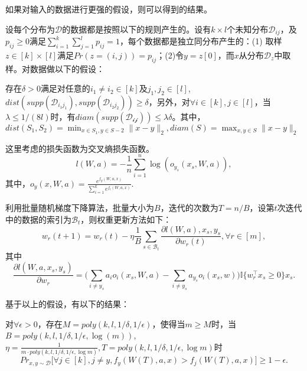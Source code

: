 \par
如果对输入的数据进行更强的假设，则可以得到\citet{li2018learning}的结果。
\par
设每个分布为$\mathcal{D}$的数据都是按照以下的规则产生的。设有$k\times l $个未知分布$\mathcal{D}_{ij}$，及$p_{ij}\geq 0 $满足$\sum_{i=1}^k \sum_{j=1}^l p_{ij} = 1$，每个数据都是独立同分布产生的：(1) 取样$z\in[k]\times [l]$满足$Pr(z = (i,j)) = p_{ij}$；(2)令$y = z[0]$，而$x$从分布$\mathcal{D}_{z}$中取样。对数据做以下的假设：
\begin{assumption}
存在$\delta > 0$满足对任意的$i_1\neq i_2 \in [k]$及$j_1,j_2\in [l]$,$dist(supp(\mathcal{D}_{i_1j_1}),supp(\mathcal{D}_{i_2j_2}))\geq \delta$，另外，对$\forall i\in [k],j\in[l]$，当$\lambda \leq 1/(8l)$时，有$diam(supp(\mathcal{D_{ij}}))\leq \lambda\delta$。其中，$dist(S_1,S_2) = \min_{x\in S_1, y\in S-2} \|x-y\|_2, diam(S) = \max_{x,y\in S} \|x-y\|_2$
\end{assumption}
\par
这里考虑的损失函数为交叉熵损失函数。
\[
l(W,a) = -\frac{1}{n}\sum_{i=1}^n\log(o_{y_s}(x_s,W,a)),
\]
其中，$o_y(x,W,a) = \frac{e^{f_y(W,a,x)}}{\sum_{i=1}^ke^{f_i(W,a,x)}}$.
\par
利用批量随机梯度下降算法，批量大小为$B$，迭代的次数为$T = n/B$，设第$t$次迭代中的数据的索引为$\mathcal{B}_t$，则权重更新方法如下：
\begin{equation}
w_r(t+1) = w_r(t) - \eta\frac{1}{B}\sum_{s\in \mathcal{B}_t}\frac{\partial l(W,a),x_s,y_s}{\partial w_r(t)}, \forall r \in [m],
\end{equation}
其中
\[
\frac{\partial l(W,a,x_s,y_s)}{\partial w_r} = \bigg(\sum_{i\neq y_s }a_i o_i(x_s,W,a)- \sum_{i\neq y_s}a_{y_s}o_i(x_s,w)\bigg)\mathbb{I}\{w_r^\top x_s\geq 0\}x_s.
\]
\par
基于以上的假设，有以下的结果：
\begin{theorem}
对$\forall \epsilon > 0$，存在$M = poly(k,l,1/\delta,1/\epsilon)$，使得当$m\geq M$时，当$B = poly(k,l,1/\delta,1/\epsilon,\log(m))$,$\eta = \frac{1}{m\cdot poly(k,l,1/\delta,1/\epsilon,\log m)}, T = poly(k,l,1/\delta,1/\epsilon,\log m)$时
\[
Pr_{x,y\sim \mathcal{D}}\big[\forall j \in [k], j\neq y, f_y(W(T),a,x)>f_j(W(T),a,x)\big]\geq 1-\epsilon.
\]
\end{theorem}

